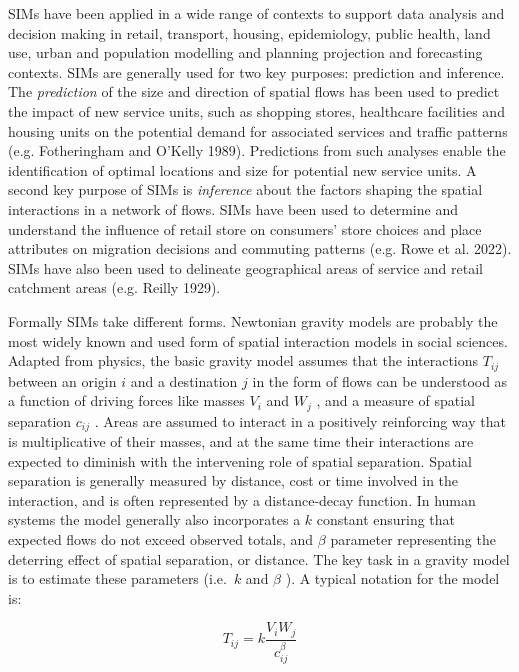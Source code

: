 \documentclass[11pt,letterpaper]{article}
\begin{document}
SIMs have been applied in a wide range of contexts to support data analysis and decision making in retail, transport, housing, epidemiology, public health, land use, urban and population modelling and planning projection and forecasting contexts.
SIMs are generally used for two key purposes: prediction and inference.
The \emph{prediction} of the size and direction of spatial flows has been used to predict the impact of new service units, such as shopping stores, healthcare facilities and housing units on the potential demand for associated services and traffic patterns (e.g. Fotheringham and O'Kelly 1989). Predictions from such analyses enable the identification of optimal locations and size for potential new service units. A second key purpose of SIMs is \emph{inference} about the factors shaping the spatial interactions in a network of flows. SIMs have been used to determine and understand the influence of retail store on consumers' store choices and place attributes on migration decisions and commuting patterns (e.g. Rowe et al. 2022). SIMs have also been used to delineate geographical areas of service and retail catchment areas (e.g. Reilly 1929).

Formally SIMs take different forms.
Newtonian gravity models are probably the most widely known and used form of spatial interaction models in social sciences.
Adapted from physics, the basic gravity model assumes that the interactions \(T_{i j}\) between an origin \(i\) and a destination \(j\) in the form of flows can be understood as a function of driving forces like masses \(V_{i}\) and \(W_{j}\) , and a measure of spatial separation \(c_{ij}\) .
Areas are assumed to interact in a positively reinforcing way that is multiplicative of their masses, and at the same time their interactions are expected to diminish with the intervening role of spatial separation.
Spatial separation is generally measured by distance, cost or time involved in the interaction, and is often represented by a distance-decay function.
In human systems the model generally also incorporates a \(k\) constant ensuring that expected flows do not exceed observed totals, and \(\beta\) parameter representing the deterring effect of spatial separation, or distance.
The key task in a gravity model is to estimate these parameters (i.e.~\(k\) and \(\beta\) ).
A typical notation for the model is:

\[
T_{i j}=k \frac{V_{i} W_{j}}{c_{i j}^{\beta}}
\]
\end{document}
